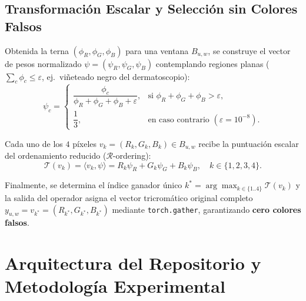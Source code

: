 \documentclass[10pt,a4paper,twocolumn]{article}
\begin{document}
\subsection{Transformación Escalar y Selección sin Colores Falsos}
Obtenida la terna $(\phi_R, \phi_G, \phi_B)$ para una ventana $B_{u,w}$, se construye el vector de pesos normalizado $\psi = (\psi_R, \psi_G, \psi_B)$ contemplando regiones planas ($\sum_c \phi_c \le \varepsilon$, ej.\ viñeteado negro del dermatoscopio):
\begin{equation}
  \psi_c = \begin{cases}
    \dfrac{\phi_c}{\phi_R + \phi_G + \phi_B + \varepsilon}, & \text{si } \phi_R + \phi_G + \phi_B > \varepsilon, \\[0.25cm]
    \dfrac{1}{3}, & \text{en caso contrario } (\varepsilon = 10^{-8}).
  \end{cases}
  \label{eq:psi_norm}
\end{equation}

Cada uno de los $4$ píxeles $v_k = (R_k, G_k, B_k) \in B_{u,w}$ recibe la puntuación escalar del ordenamiento reducido ($\mathcal{R}$-ordering):
\begin{equation}
  \mathcal{T}(v_k) = \langle v_k, \psi \rangle = R_k \psi_R + G_k \psi_G + B_k \psi_B, \quad k \in \{1,2,3,4\}.
  \label{eq:inner_prod}
\end{equation}

Finalmente, se determina el índice ganador único $k^* = \arg\max_{k \in \{1..4\}} \mathcal{T}(v_k)$ y la salida del operador asigna el vector tricromático original completo $y_{u,w} = v_{k^*} = (R_{k^*}, G_{k^*}, B_{k^*})$ mediante \texttt{torch.gather}, garantizando \textbf{cero colores falsos}.

\section{Arquitectura del Repositorio y Metodología Experimental}
\end{document}
